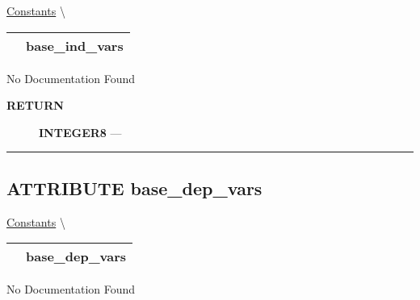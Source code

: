 \hypertarget{ecldoc:logisticregression.constants.base_ind_vars}{}
\hspace{0pt} \hyperlink{ecldoc:LogisticRegression.Constants}{Constants} \textbackslash 

{\renewcommand{\arraystretch}{1.5}
\begin{tabularx}{\textwidth}{|>{\raggedright\arraybackslash}l|X|}
\hline
\hspace{0pt}\mytexttt{\color{red} } & \textbf{base\_ind\_vars} \\
\hline
\end{tabularx}
}

\par





No Documentation Found








\par
\begin{description}
\item [\colorbox{tagtype}{\color{white} \textbf{\textsf{RETURN}}}] \textbf{INTEGER8} --- 
\end{description}




\rule{\linewidth}{0.5pt}
\subsection*{\textsf{\colorbox{headtoc}{\color{white} ATTRIBUTE}
base\_dep\_vars}}

\hypertarget{ecldoc:logisticregression.constants.base_dep_vars}{}
\hspace{0pt} \hyperlink{ecldoc:LogisticRegression.Constants}{Constants} \textbackslash 

{\renewcommand{\arraystretch}{1.5}
\begin{tabularx}{\textwidth}{|>{\raggedright\arraybackslash}l|X|}
\hline
\hspace{0pt}\mytexttt{\color{red} } & \textbf{base\_dep\_vars} \\
\hline
\end{tabularx}
}

\par





No Documentation Found








